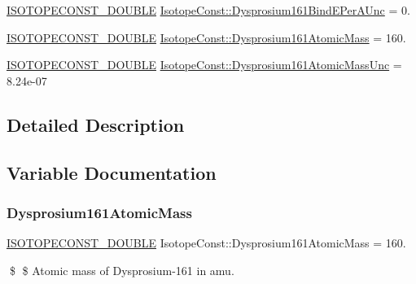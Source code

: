 \begin{DoxyCompactItemize}
\mbox{\hyperlink{group___isotope_const-_macros_ga8f45a7272ce02c0b4c65c44636ed719a}{I\+S\+O\+T\+O\+P\+E\+C\+O\+N\+S\+T\+\_\+\+D\+O\+U\+B\+LE}} \mbox{\hyperlink{group___isotope_const-_dysprosium-_dy161_ga1046bc86c2ba6c3a70797149318f6d0a}{Isotope\+Const\+::\+Dysprosium161\+Bind\+E\+Per\+A\+Unc}} = 0.
\item 
\mbox{\hyperlink{group___isotope_const-_macros_ga8f45a7272ce02c0b4c65c44636ed719a}{I\+S\+O\+T\+O\+P\+E\+C\+O\+N\+S\+T\+\_\+\+D\+O\+U\+B\+LE}} \mbox{\hyperlink{group___isotope_const-_dysprosium-_dy161_ga08730af75d3833f01c23f73dc82bd10e}{Isotope\+Const\+::\+Dysprosium161\+Atomic\+Mass}} = 160.
\item 
\mbox{\hyperlink{group___isotope_const-_macros_ga8f45a7272ce02c0b4c65c44636ed719a}{I\+S\+O\+T\+O\+P\+E\+C\+O\+N\+S\+T\+\_\+\+D\+O\+U\+B\+LE}} \mbox{\hyperlink{group___isotope_const-_dysprosium-_dy161_ga9021e8b931b2c67d7a9852f7346938ff}{Isotope\+Const\+::\+Dysprosium161\+Atomic\+Mass\+Unc}} = 8.\+24e-\/07
\end{DoxyCompactItemize}


\subsection{Detailed Description}


\subsection{Variable Documentation}
\mbox{\label{group___isotope_const-_dysprosium-_dy161_ga08730af75d3833f01c23f73dc82bd10e}} 
\subsubsection{\texorpdfstring{Dysprosium161\+Atomic\+Mass}{Dysprosium161AtomicMass}}
{\footnotesize\ttfamily \mbox{\hyperlink{group___isotope_const-_macros_ga8f45a7272ce02c0b4c65c44636ed719a}{I\+S\+O\+T\+O\+P\+E\+C\+O\+N\+S\+T\+\_\+\+D\+O\+U\+B\+LE}} Isotope\+Const\+::\+Dysprosium161\+Atomic\+Mass = 160.}

\$ \$ Atomic mass of Dysprosium-\/161 in amu. \mbox{\label{group___isotope_const-_dysprosium-_dy161_ga9021e8b931b2c67d7a9852f7346938ff}} 
